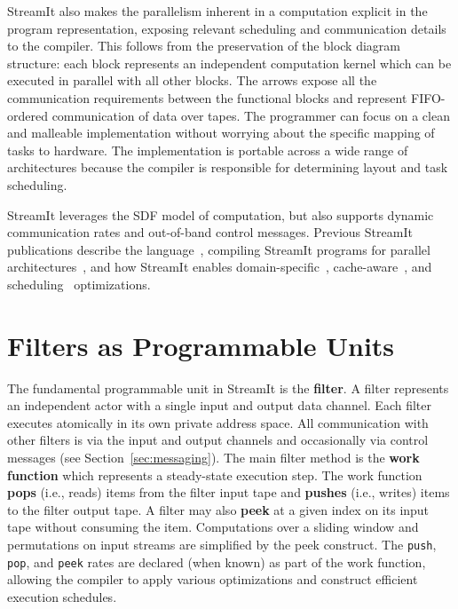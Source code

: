 StreamIt also makes the parallelism inherent in
a computation explicit in the program representation,
exposing relevant scheduling and communication details 
to the compiler.
This follows from the preservation of the 
block diagram structure:
each block represents an independent computation kernel which can be 
executed in parallel with all other blocks. The arrows expose all the 
communication requirements between the functional blocks
and represent FIFO-ordered communication of data over tapes. 
The programmer can focus on a clean and malleable implementation
without worrying about the specific mapping of tasks to hardware. 
The implementation is portable across a wide range of architectures
because the compiler is responsible for determining layout and 
task scheduling.

StreamIt leverages the SDF model of
computation, but also supports dynamic communication rates and
out-of-band control messages.  
Previous StreamIt publications describe the language~\cite{streamitcc}, 
compiling StreamIt programs for 
parallel architectures~\cite{gordon02asplos, thies05ppopp},
and how StreamIt enables domain-specific~\cite{agrawal05cases, lamb03pldi},
cache-aware~\cite{sermulins05lctes}, and scheduling~\cite{karczmarek:sm-thesis:2002} 
optimizations.

\section{Filters as Programmable Units}

The fundamental programmable unit in StreamIt is the \textbf{filter}.
A filter represents an independent actor with a single input and output 
data channel. Each
filter executes atomically in its own private address space. All communication with
other filters is via the input and output channels and occasionally
via control messages (see Section~\ref{sec:messaging}). The main filter 
method is the \textbf{work function} which represents a steady-state execution step.
The work function \textbf{pops} (i.e., reads) items from the filter input tape
and \textbf{pushes} (i.e., writes) items to the filter output tape. A filter
may also \textbf{peek} at a given index on its input tape without consuming the
item. 
Computations over a sliding window and permutations on input streams are simplified
by the peek construct.
The {\tt push}, 
{\tt pop}, and {\tt peek} rates are declared (when known) as part of
the work function, allowing the compiler to apply various optimizations
and construct efficient execution schedules. 

